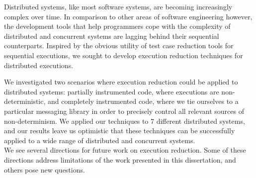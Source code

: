 Distributed systems, like most software systems, are becoming increasingly complex over time.
In comparison to other areas of software engineering however, the development
tools that help programmers cope with the complexity of distributed and
concurrent systems are lagging behind their sequential counterparts.
Inspired by the obvious utility of test case reduction tools for sequential
executions, we sought to develop
execution reduction techniques for distributed executions.

We investigated two scenarios where execution reduction could be applied to
distributed systems: partially instrumented code, where executions are non-deterministic, and
completely instrumented code, where we tie ourselves to a particular messaging
library in order
to precisely control all relevant sources of non-determinism. We applied our
techniques to 7 different distributed systems, and our results
leave us optimistic that these techniques can be
successfully applied to a wide range of distributed and concurrent
systems.\\[2.5ex]
%
%
 We see several directions for future work on execution reduction. Some of
these directions address limitations of the work presented in this
dissertation, and others pose new questions.

